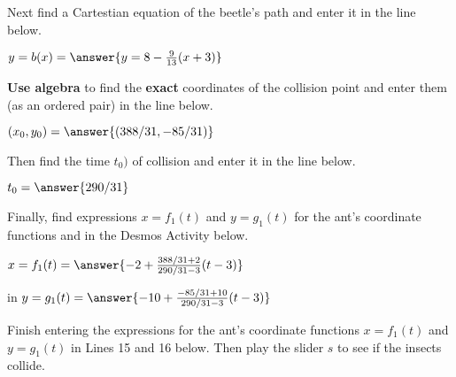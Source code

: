 \documentclass{ximera}
\begin{document}
Next find a Cartestian equation of the beetle's path and enter it in the line below.

\begin{question}  
         $ y=b(x) =  \answer{y=8-\frac{9}{13}(x+3)}$  
    \end{question}

{\bf Use algebra} to find the {\bf exact} coordinates of the collision point and enter them (as an ordered pair) in the line below.

\begin{question}  
         $ (x_0,y_0) =  \answer{(388/31 , -85/31)}$
    \end{question}

Then find the time $t_0)$ of collision and enter it in the line below.

\begin{question}  
         $ t_0 =  \answer{290/31}$
    \end{question}

Finally, find expressions $x=f_1(t)$ and $y=g_1(t)$ for the ant's coordinate functions and in the Desmos Activity below.

\begin{question}  
         $ x = f_1(t) =   \answer{-2+\frac{388/31+2}{290/31-3}(t-3)}$

         in $y=g_1(t) =  \answer{-10+\frac{-85/31+10}{290/31-3}(t-3)}$
    \end{question}


\begin{exploration}\label{exp:pc1c}
Finish entering the expressions for the ant's coordinate functions $x=f_1(t)$ and $y=g_1(t)$ in Lines 15 and 16 below. Then play the slider $s$ to see if the insects collide.
 
\begin{onlineOnly}
    \begin{center}
\end{center}
\end{onlineOnly}
\end{exploration}
\end{document}
